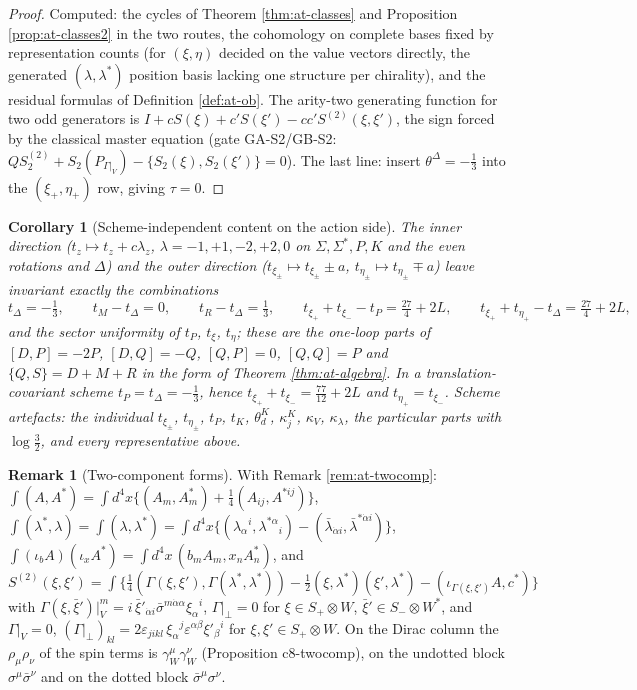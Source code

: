 \documentclass[11pt]{article}
\numberwithin{equation}{section}
\theoremstyle{plain}
\newtheorem{corollary}[theorem]{Corollary}
\theoremstyle{definition}
\newtheorem{remark}[theorem]{Remark}
\begin{document}
\begin{proof}
Computed: the cycles of Theorem \ref{thm:at-classes} and Proposition \ref{prop:at-classes2} in the two routes, the cohomology on complete bases fixed by representation counts (for $(\xi,\eta)$ decided on the value vectors directly, the generated $(\lambda,\lambda^*)$ position basis lacking one structure per chirality), and the residual formulas of Definition \ref{def:at-ob}. The arity-two generating function for two odd generators is $I+cS(\xi)+c'S(\xi')-cc'S^{(2)}(\xi,\xi')$, the sign forced by the classical master equation (gate GA-S2/GB-S2: $QS^{(2)}_2+S_2(P_{\Gamma|_V})-\{S_2(\xi),S_2(\xi')\}=0$). The last line: insert $\theta^\Delta=-\tfrac13$ into the $(\xi_+,\eta_+)$ row, giving $\tau=0$.
\end{proof}

\begin{corollary}[Scheme-independent content on the action side]
\label{cor:at-c-inv}
The inner direction ($t_z\mapsto t_z+c\lambda_z$, $\lambda=-1,+1,-2,+2,0$ on $\Sigma,\Sigma^*,P,K$ and the even rotations and $\Delta$) and the outer direction ($t_{\xi_\pm}\mapsto t_{\xi_\pm}\pm a$, $t_{\eta_\pm}\mapsto t_{\eta_\pm}\mp a$) leave invariant exactly the combinations
\[
t_\Delta=-\tfrac13,\qquad t_M-t_\Delta=0,\qquad t_R-t_\Delta=\tfrac13,\qquad t_{\xi_+}+t_{\xi_-}-t_P=\tfrac{27}4+2L,\qquad t_{\xi_+}+t_{\eta_+}-t_\Delta=\tfrac{27}4+2L,
\]
and the sector uniformity of $t_P$, $t_\xi$, $t_\eta$; these are the one-loop parts of $[D,P]=-2P$, $[D,Q]=-Q$, $[Q,P]=0$, $[Q,Q]=P$ and $\{Q,S\}=D+M+R$ in the form of Theorem \ref{thm:at-algebra}. In a translation-covariant scheme $t_P=t_\Delta=-\tfrac13$, hence $t_{\xi_+}+t_{\xi_-}=\tfrac{77}{12}+2L$ and $t_{\eta_+}=t_{\xi_-}$. Scheme artefacts: the individual $t_{\xi_\pm}$, $t_{\eta_\pm}$, $t_P$, $t_K$, $\theta^K_d$, $\kappa^K_j$, $\kappa_V$, $\kappa_\lambda$, the particular parts with $\log\tfrac32$, and every representative above.
\end{corollary}

\begin{remark}[Two-component forms]
\label{rem:at-c-tc}
With Remark \ref{rem:at-twocomp}: $\int(A,A^*)=\int d^4x\{(A_m,A^*_m)+\tfrac14(A_{ij},A^{*ij})\}$, $\int(\lambda^*,\lambda)=\int(\lambda,\lambda^*)=\int d^4x\{(\lambda_\alpha{}^i,\lambda^{*\alpha}{}_i)-(\bar\lambda_{\dot\alpha i},\bar\lambda^{*\dot\alpha i})\}$, $\int(\iota_bA)(\iota_xA^*)=\int d^4x\,(b_mA_m,x_nA^*_n)$, and $S^{(2)}(\xi,\xi')=\int\{\tfrac14(\Gamma(\xi,\xi'),\Gamma(\lambda^*,\lambda^*))-\tfrac12(\xi,\lambda^*)(\xi',\lambda^*)-(\iota_{\Gamma(\xi,\xi')}A,c^*)\}$ with $\Gamma(\xi,\bar\xi')|_V^m=i\,\bar\xi'_{\dot\alpha i}\bar\sigma^{m\dot\alpha\alpha}\xi_\alpha{}^i$, $\Gamma|_\perp=0$ for $\xi\in S_+\otimes W$, $\bar\xi'\in S_-\otimes W^*$, and $\Gamma|_V=0$, $(\Gamma|_\perp)_{kl}=2\varepsilon_{jikl}\,\xi_\alpha{}^j\varepsilon^{\alpha\beta}\xi'_\beta{}^i$ for $\xi,\xi'\in S_+\otimes W$. On the Dirac column the $\rho_\mu\rho_\nu$ of the spin terms is $\gamma^\mu_W\gamma^\nu_W$ (Proposition c8-twocomp), on the undotted block $\sigma^\mu\bar\sigma^\nu$ and on the dotted block $\bar\sigma^\mu\sigma^\nu$.
\end{remark}
\end{document}
